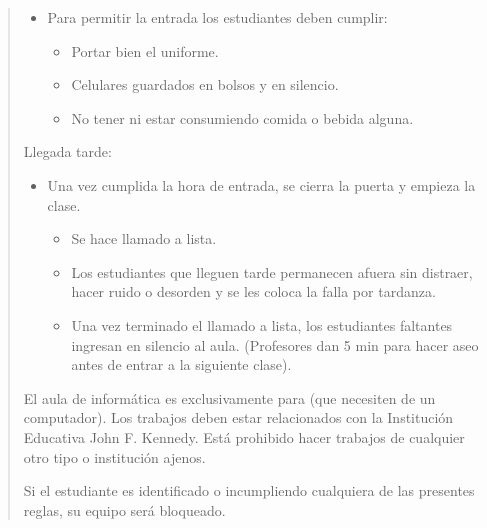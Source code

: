 \documentclass[letterpaper,10pt,spanish]{sphinxmanual}
\begin{document}
\begin{quote}
\begin{description}
\begin{itemize}
\item {} 
\sphinxAtStartPar
Para permitir la entrada los estudiantes deben cumplir:
\begin{itemize}
\item {} 
\sphinxAtStartPar
Portar bien el uniforme.

\item {} 
\sphinxAtStartPar
Celulares guardados en bolsos y en silencio.

\item {} 
\sphinxAtStartPar
No tener ni estar consumiendo comida o bebida alguna.

\end{itemize}

\end{itemize}

\sphinxAtStartPar
Llegada tarde:
\begin{itemize}
\item {} 
\sphinxAtStartPar
Una vez cumplida la hora de entrada, se cierra la puerta y empieza la clase.
\begin{itemize}
\item {} 
\sphinxAtStartPar
Se hace llamado a lista.

\item {} 
\sphinxAtStartPar
Los estudiantes que lleguen tarde permanecen afuera sin distraer, hacer ruido o desorden y se les coloca la falla por tardanza.

\item {} 
\sphinxAtStartPar
Una vez terminado el llamado a lista, los estudiantes faltantes ingresan en silencio al aula. (Profesores dan 5 min para hacer aseo antes de entrar a la siguiente clase).

\end{itemize}

\end{itemize}

\sphinxAtStartPar
El aula de informática es exclusivamente para  (que necesiten de un computador). Los trabajos deben estar relacionados con la Institución Educativa John F. Kennedy. Está prohibido hacer trabajos de cualquier otro tipo o institución ajenos.

\sphinxAtStartPar
Si el estudiante es identificado  o incumpliendo cualquiera de las presentes reglas, su equipo será bloqueado.

\end{description}\end{quote}
\end{document}
